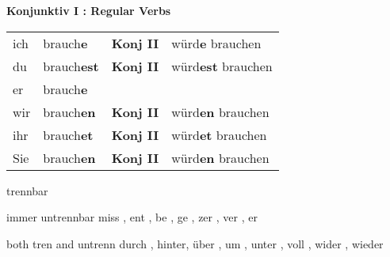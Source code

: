 \documentclass[a4paper,twocolumn,10pt]{article}
\begin{document}
\textbf{Konjunktiv I : Regular Verbs}
\begin{table}[htpb]
	\centering
	\begin{tabular}{llll}

ich & brauch\textcolor{cell-lightgreen}{\textbf{e}}
&  \textcolor{cell-lightred}{\textbf{Konj II}}
& würd\textcolor{cell-lightgreen}{\textbf{e}} brauchen

\\


du & brauch\textcolor{cell-lightgreen}{\textbf{est}}
& \textcolor{cell-lightred}{\textbf{Konj II}}
& würd\textcolor{cell-lightgreen}{\textbf{est}} brauchen

\\


er & brauch\textcolor{cell-lightgreen}{\textbf{e}}
& 
&
\\

wir & brauch\textcolor{cell-lightgreen}{\textbf{en}}
& \textcolor{cell-lightred}{\textbf{Konj II}}
& würd\textcolor{cell-lightgreen}{\textbf{en}} brauchen

\\

ihr & brauch\textcolor{cell-lightgreen}{\textbf{et}}
& \textcolor{cell-lightred}{\textbf{Konj II}}
& würd\textcolor{cell-lightgreen}{\textbf{et}} brauchen

\\

Sie & brauch\textcolor{cell-lightgreen}{\textbf{en}} 
& \textcolor{cell-lightred}{\textbf{Konj II}}
& würd\textcolor{cell-lightgreen}{\textbf{en}} brauchen
\\

	\end{tabular}
\end{table}




trennbar

immer untrennbar
miss , ent , be , ge , zer , ver , er

both tren and untrenn
durch , hinter, über , um , unter , voll , wider , wieder








\onecolumn
\nolinenumbers




\end{document}
